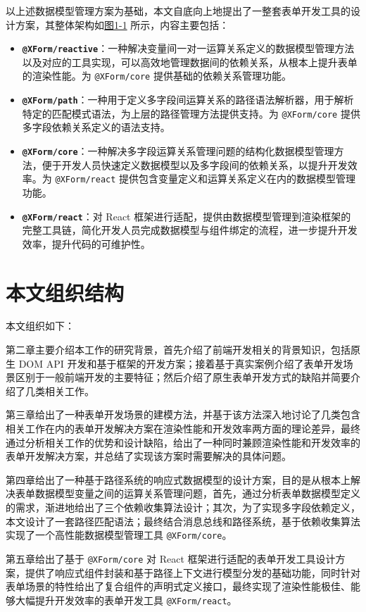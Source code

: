\documentclass[winfonts,master,twoside]{njuthesis}
\makeatletter
\newcommand{\xform}[1]{\texttt{@XForm/#1}}
\makeatother
\begin{document}
以上述数据模型管理方案为基础，本文自底向上地提出了一整套表单开发工具的设计方案，其整体架构如\hyperref[overview]{图1-1} 所示，内容主要包括：

\begin{itemize}
    \item \textbf{\xform{reactive}}：一种解决变量间一对一运算关系定义的数据模型管理方法以及对应的工具实现，可以高效地管理数据间的依赖关系，从根本上提升表单的渲染性能。为 \xform{core} 提供基础的依赖关系管理功能。
    \item \textbf{\xform{path}}：一种用于定义多字段间运算关系的路径语法解析器，用于解析特定的匹配模式语法，为上层的路径管理方法提供支持。为 \xform{core} 提供多字段依赖关系定义的语法支持。
    \item \textbf{\xform{core}}：一种解决多字段运算关系管理问题的结构化数据模型管理方法，便于开发人员快速定义数据模型以及多字段间的依赖关系，以提升开发效率。为 \xform{react} 提供包含变量定义和运算关系定义在内的数据模型管理功能。
    \item \textbf{\xform{react}}：对 React 框架进行适配，提供由数据模型管理到渲染框架的完整工具链，简化开发人员完成数据模型与组件绑定的流程，进一步提升开发效率，提升代码的可维护性。
\end{itemize}

\section{本文组织结构}

本文组织如下：

第二章主要介绍本工作的研究背景，首先介绍了前端开发相关的背景知识，包括原生 DOM API 开发和基于框架的开发方案；接着基于真实案例介绍了表单开发场景区别于一般前端开发的主要特征；然后介绍了原生表单开发方式的缺陷并简要介绍了几类相关工作。

第三章给出了一种表单开发场景的建模方法，并基于该方法深入地讨论了几类包含相关工作在内的表单开发解决方案在渲染性能和开发效率两方面的理论差异，最终通过分析相关工作的优势和设计缺陷，给出了一种同时兼顾渲染性能和开发效率的表单开发解决方案，并总结了实现该方案时需要解决的具体问题。

第四章给出了一种基于路径系统的响应式数据模型的设计方案，目的是从根本上解决表单数据模型变量之间的运算关系管理问题，首先，通过分析表单数据模型定义的需求，渐进地给出了三个依赖收集算法设计；其次，为了实现多字段依赖定义，本文设计了一套路径匹配语法；最终结合消息总线和路径系统，基于依赖收集算法实现了一个高性能数据模型管理工具 \xform{core}。

第五章给出了基于 \xform{core} 对 React 框架进行适配的表单开发工具设计方案，提供了响应式组件封装和基于路径上下文进行模型分发的基础功能，同时针对表单场景的特性给出了复合组件的声明式定义接口，最终实现了渲染性能极佳、能够大幅提升开发效率的表单开发工具 \xform{react}。
\end{document}
